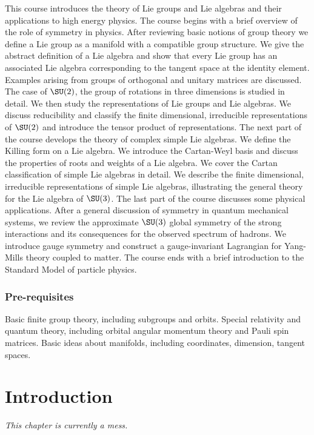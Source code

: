 \documentclass[a4paper]{article}
\begin{document}
\maketitle
{\small
\setlength{\parindent}{0em}
\setlength{\parskip}{1em}

This course introduces the theory of Lie groups and Lie algebras and their applications to high energy physics. The course begins with a brief overview of the role of symmetry in physics. After reviewing basic notions of group theory we define a Lie group as a manifold with a compatible group structure. We give the abstract definition of a Lie algebra and show that every Lie group has an associated Lie algebra corresponding to the tangent space at the identity element. Examples arising from groups of orthogonal and unitary matrices are discussed. The case of $\SU(2)$, the group of rotations in three dimensions is studied in detail. We then study the representations of Lie groups and Lie algebras. We discuss reducibility and classify the finite dimensional, irreducible representations of $\SU(2)$ and introduce the tensor product of representations. The next part of the course develops the theory of complex simple Lie algebras. We define the Killing form on a Lie algebra. We introduce the Cartan-Weyl basis and discuss the properties of roots and weights of a Lie algebra. We cover the Cartan classification of simple Lie algebras in detail. We describe the finite dimensional, irreducible representations of simple Lie algebras, illustrating the general theory for the Lie algebra of $\SU(3)$. The last part of the course discusses some physical applications. After a general discussion of symmetry in quantum mechanical systems, we review the approximate $\SU(3)$ global symmetry of the strong interactions and its consequences for the observed spectrum of hadrons. We introduce gauge symmetry and construct a gauge-invariant Lagrangian for Yang-Mills theory coupled to matter. The course ends with a brief introduction to the Standard Model of particle physics.

\subsubsection*{Pre-requisites}
Basic finite group theory, including subgroups and orbits. Special relativity and quantum theory, including orbital angular momentum theory and Pauli spin matrices. Basic ideas about manifolds, including coordinates, dimension, tangent spaces.
}
\tableofcontents

\section{Introduction}
\emph{This chapter is currently a mess.}
\end{document}
